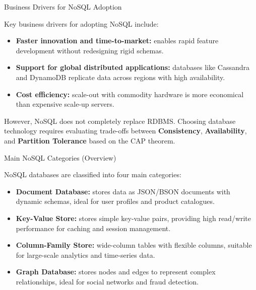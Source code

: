 \documentclass[aspectratio=169, table]{beamer}
\begin{document}
\begin{frame}{Business Drivers for NoSQL Adoption}
	\vspace{20pt}
	
	Key business drivers for adopting NoSQL include:
	
	\vspace{10pt}
	\begin{itemize}
		\item \textbf{Faster innovation and time-to-market:} enables rapid feature development without redesigning rigid schemas.
		\item \textbf{Support for global distributed applications:} databases like Cassandra and DynamoDB replicate data across regions with high availability.
		\item \textbf{Cost efficiency:} scale-out with commodity hardware is more economical than expensive scale-up servers.
	\end{itemize}
	
	\vspace{10pt}
	However, NoSQL does not completely replace RDBMS. Choosing database technology requires evaluating trade-offs between \textbf{Consistency}, \textbf{Availability}, and \textbf{Partition Tolerance} based on the CAP theorem.
	
\end{frame}

\begin{frame}{Main NoSQL Categories (Overview)}
	\vspace{20pt}
	
	NoSQL databases are classified into four main categories:
	
	\begin{itemize}
		\item \textbf{Document Database:} stores data as JSON/BSON documents with dynamic schemas, ideal for user profiles and product catalogues.
		\item \textbf{Key-Value Store:} stores simple key-value pairs, providing high read/write performance for caching and session management.
		\item \textbf{Column-Family Store:} wide-column tables with flexible columns, suitable for large-scale analytics and time-series data.
		\item \textbf{Graph Database:} stores nodes and edges to represent complex relationships, ideal for social networks and fraud detection.
	\end{itemize}
	
\end{frame}
\end{document}

